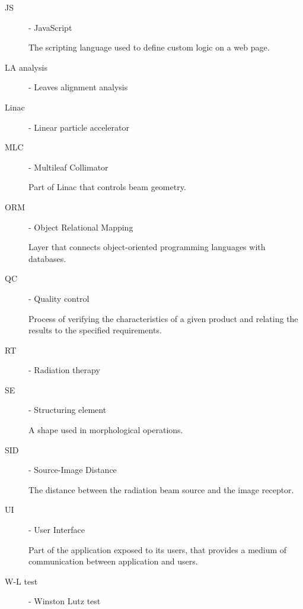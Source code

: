 \begin{description}
    \item[JS] - JavaScript

    The scripting language used to define custom logic on a web page.

    \item[LA analysis] - Leaves alignment analysis

    \item[Linac] - Linear particle accelerator
    
    \item[MLC] - Multileaf Collimator
    
    Part of Linac that controls beam geometry.

    \item[ORM] - Object Relational Mapping

    Layer that connects object-oriented programming languages with databases.

    \item[QC] - Quality control

    Process of verifying the characteristics of a given product and relating the results to the specified requirements.

    \item[RT] - Radiation therapy

    \item[SE] - Structuring element

    A shape used in morphological operations.

    \item[SID] - Source-Image Distance

    The distance between the radiation beam source and the image receptor.

    \item[UI] - User Interface
    
    Part of the application exposed to its users, that provides a medium of communication between application and users.

    \item[W-L test] - Winston Lutz test
\end{description}
